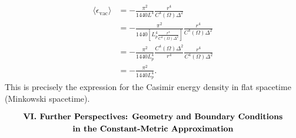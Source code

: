 \documentclass[english]{article}
\begin{document}
\begin{align*}
\langle\epsilon_{\text{vac}}\rangle & =-\frac{\pi^{2}}{1440L^{4}}\frac{r^{4}}{C^{4}\left(\Omega\right)\Delta^{2}}\\
 & =-\frac{\pi^{2}}{1440\left[L^{4}_{p}\frac{r^{4}}{C^{4}\left(\Omega\right)\Delta^{2}}\right]}\frac{r^{4}}{C^{4}\left(\Omega\right)\Delta^{2}}\\
 & =-\frac{\pi^{2}}{1440L^{4}_{p}}\frac{C^{4}\left(\Omega\right)\Delta^{2}}{r^{4}}\frac{r^{4}}{C^{4}\left(\Omega\right)\Delta^{2}}\\
 & =-\frac{\pi^{2}}{1440L^{4}_{p}}.
\end{align*}
 This is precisely the expression for the Casimir energy density in
flat spacetime (Minkowski spacetime).

\Needspace{110pt}\par\addvspace{20pt}\noindent\begin{minipage}{\linewidth}\begingroup\fontsize{12}{15}\selectfont\setlength{\abovedisplayskip}{0pt}\setlength{\belowdisplayskip}{0pt}\setlength{\abovedisplayshortskip}{0pt}\setlength{\belowdisplayshortskip}{0pt}
\[
\begin{gathered}\text{\bfseries VI. Further Perspectives: Geometry and Boundary Conditions}\\
\text{\bfseries in the Constant-Metric Approximation}
\end{gathered}
\]
\endgroup\end{minipage}\par\nopagebreak[4]\vspace{20pt}\nopagebreak[4]
\end{document}
